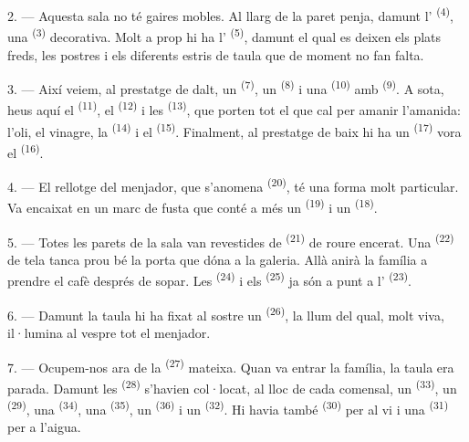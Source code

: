 2. --- Aquesta sala no té gaires mobles. Al llarg de la paret penja, damunt
l' \textsuperscript{(4)}, una  \textsuperscript{(3)}
decorativa. Molt a prop hi ha l' \textsuperscript{(5)}, damunt el qual es
deixen els plats freds, les postres i els diferents estris de taula que de moment no fan
falta.

3. --- Així veiem, al prestatge de dalt, un  \textsuperscript{(7)},
un  \textsuperscript{(8)} i una  \textsuperscript{(10)} amb
 \textsuperscript{(9)}. A sota, heus aquí el 
\textsuperscript{(11)}, el  \textsuperscript{(12)} i les 
\textsuperscript{(13)}, que porten tot el que cal per amanir l'amanida: l'oli, el vinagre, la
 \textsuperscript{(14)} i el  \textsuperscript{(15)}. Finalment, al
prestatge de baix hi ha un  \textsuperscript{(17)} vora el
 \textsuperscript{(16)}.

4. --- El rellotge del menjador, que s'anomena 
\textsuperscript{(20)}, té una forma molt particular. Va encaixat en un marc de fusta que
conté a més un  \textsuperscript{(19)} i un
 \textsuperscript{(18)}.

\VUsaut{4.6mm}
\VUsaut{3.0mm}

5. --- Totes les parets de la sala van revestides de 
\textsuperscript{(21)} de roure encerat. Una  \textsuperscript{(22)} de tela
tanca prou bé la porta que dóna a la galeria. Allà anirà la família a prendre el cafè després
de sopar. Les  \textsuperscript{(24)} i els 
\textsuperscript{(25)} ja són a punt a l'
\textsuperscript{(23)}.

6. --- Damunt la taula hi ha fixat al sostre un  \textsuperscript{(26)},
la llum del qual, molt viva, il·lumina al vespre tot el menjador.

7. --- Ocupem-nos ara de la  \textsuperscript{(27)} mateixa. Quan
va entrar la família, la taula era parada. Damunt les
 \textsuperscript{(28)} s'havien col·locat, al lloc de cada
comensal, un  \textsuperscript{(33)}, un  \textsuperscript{(29)},
una  \textsuperscript{(34)}, una
 \textsuperscript{(35)}, un 
\textsuperscript{(36)} i un  \textsuperscript{(32)}. Hi havia també
 \textsuperscript{(30)} per al vi i una 
\textsuperscript{(31)} per a l'aigua.


